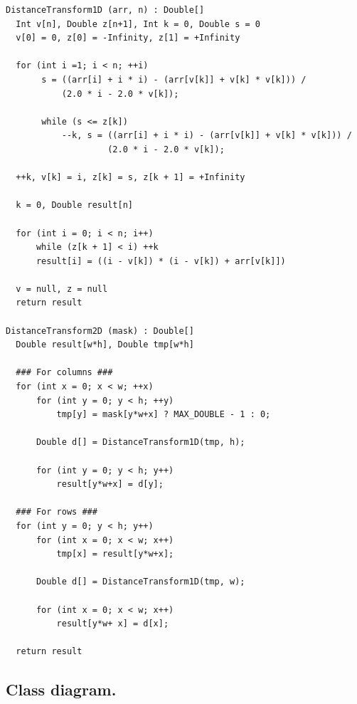 \documentclass[a4paper,11pt,oneside]{article}
\begin{document}
\begin{verbatim}
DistanceTransform1D (arr, n) : Double[]
  Int v[n], Double z[n+1], Int k = 0, Double s = 0
  v[0] = 0, z[0] = -Infinity, z[1] = +Infinity

  for (int i =1; i < n; ++i)
       s = ((arr[i] + i * i) - (arr[v[k]] + v[k] * v[k])) / 
           (2.0 * i - 2.0 * v[k]);

       while (s <= z[k])
           --k, s = ((arr[i] + i * i) - (arr[v[k]] + v[k] * v[k])) / 
                    (2.0 * i - 2.0 * v[k]);

  ++k, v[k] = i, z[k] = s, z[k + 1] = +Infinity

  k = 0, Double result[n]

  for (int i = 0; i < n; i++)
      while (z[k + 1] < i) ++k
      result[i] = ((i - v[k]) * (i - v[k]) + arr[v[k]])

  v = null, z = null
  return result

DistanceTransform2D (mask) : Double[]
  Double result[w*h], Double tmp[w*h]

  ### For columns ###
  for (int x = 0; x < w; ++x)
      for (int y = 0; y < h; ++y)
          tmp[y] = mask[y*w+x] ? MAX_DOUBLE - 1 : 0;

      Double d[] = DistanceTransform1D(tmp, h);

      for (int y = 0; y < h; y++)
          result[y*w+x] = d[y];

  ### For rows ###
  for (int y = 0; y < h; y++)
      for (int x = 0; x < w; x++)
          tmp[x] = result[y*w+x];

      Double d[] = DistanceTransform1D(tmp, w);

      for (int x = 0; x < w; x++)
          result[y*w+ x] = d[x];

  return result
\end{verbatim}

\newpage
\subsection{Class diagram.}
\end{document}
